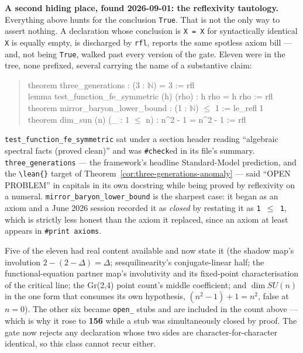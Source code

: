 \documentclass{report}
\theoremstyle{definition}
\begin{document}
\begin{itemize}
\begin{itemize}
\medskip
\noindent\textbf{A second hiding place, found 2026-09-01: the reflexivity tautology.}
Everything above hunts for the conclusion \texttt{True}. That is not the only way to assert
nothing. A declaration whose conclusion is \texttt{X = X} for syntactically identical \texttt{X}
is equally empty, is discharged by \texttt{rfl}, reports the same spotless axiom bill --- and,
not being \texttt{True}, walked past every version of the gate. Eleven were in the tree, none
prefixed, several carrying the name of a substantive claim:
\begin{quote}\ttfamily
theorem three\_generations : (3 : $\mathbb{N}$) = 3 := rfl\\
lemma test\_function\_fe\_symmetric (h) (rho) : h rho = h rho := rfl\\
theorem mirror\_baryon\_lower\_bound : (1 : $\mathbb{N}$) $\le$ 1 := le\_refl 1\\
theorem dim\_sun (n) (\_ : 1 $\le$ n) : n\^{}2 - 1 = n\^{}2 - 1 := rfl
\end{quote}
\texttt{test\_function\_fe\_symmetric} sat under a section header reading ``algebraic spectral
facts (proved clean)'' and was \texttt{\#check}ed in its file's summary.
\texttt{three\_generations} --- the framework's headline Standard-Model prediction, and the
\texttt{\textbackslash lean\{\}} target of Theorem~\ref{cor:three-generations-anomaly} --- said
``OPEN PROBLEM'' in capitals in its own docstring while being proved by reflexivity on a
numeral. \texttt{mirror\_baryon\_lower\_bound} is the sharpest case: it began as an axiom and a
June 2026 session recorded it as \emph{closed} by restating it as \texttt{1 $\le$ 1}, which is
strictly less honest than the axiom it replaced, since an axiom at least appears in
\texttt{\#print axioms}.

Five of the eleven had real content available and now state it (the shadow map's involution
$2-(2-\Delta)=\Delta$; sesquilinearity's conjugate-linear half; the functional-equation partner
map's involutivity and its fixed-point characterisation of the critical line; the Gr(2,4) point
count's middle coefficient; and $\dim SU(n)$ in the one form that consumes its own hypothesis,
$(n^2-1)+1 = n^2$, false at $n = 0$). The other six became \texttt{open\_} stubs and are
included in the count above --- which is why it rose to \textbf{156} while a stub was
simultaneously closed by proof. The gate now rejects any declaration whose two sides are
character-for-character identical, so this class cannot recur either.


\end{itemize}
\end{itemize}
\end{document}
